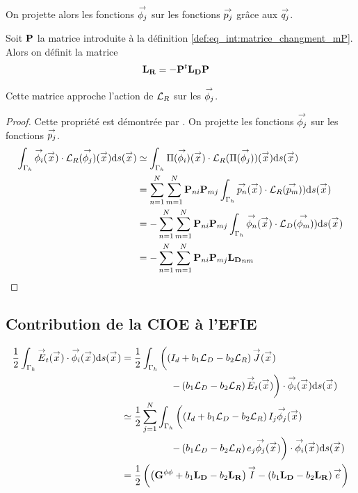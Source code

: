     On projette alors les fonctions \(\phij\) sur les fonctions \(\pj\) grâce aux \(\qj\).
    \begin{defn}
      Soit \(\mPP\) la matrice introduite à la définition \ref{def:eq_int:matrice_changment_mP}. Alors on définit la matrice
      \begin{align*}
        \mLR & = -\mPP^t\mLD\mPP
      \end{align*}
    \end{defn}
    \begin{prop}
      Cette matrice approche l'action de \(\LR\) sur les \(\phij\).
    \end{prop}
    \begin{proof}
      Cette propriété est démontrée par \cite[eq.~(17)]{stupfel_implementation_2015}. On projette les fonctions \(\phij\) sur les fonctions \(\pj\).
      \begin{align*}
        \int_{\Gamma_h} \phii(\vx) \cdot \LR(\phij)(\vx) \dd{s}(\vx) &\simeq \int_{\Gamma_h} \Pi(\phii)(\vx) \cdot \LR(\Pi(\phij)) (\vx) \dd{s}(\vx)
        \\
        &=\sum_{n=1}^{N} \sum_{m=1}^{N} \mPP_{ni} \mPP_{mj} \int_{\Gamma_h}\pn(\vx)\cdot\LR(\ppm)) \dd{s}(\vx)
        \\
        &=-\sum_{n=1}^{N} \sum_{m=1}^{N} \mPP_{ni} \mPP_{mj} \int_{\Gamma_h}\phin(\vx)\cdot\LD(\phim)) \dd{s}(\vx)
        \\
        &=-\sum_{n=1}^{N} \sum_{m=1}^{N} \mPP_{ni} \mPP_{mj} \mLD_{nm}
      \end{align*}
    \end{proof}

  \subsection{Contribution de la CIOE à l'EFIE}

    \begin{equation*}
      \begin{aligned}
        \frac{1}{2} \int_{\Gamma_h} \vE_t(\vx) \cdot \phii(\vx) \dd{s}(\vx)
        &= \frac{1}{2} \int_{\Gamma_h}  \left( \left(I_d + b_1 \LD - b_2 \LR\right) \vJ (\vx)\right.
        \\
        & \hspace{5em} \left.  - \left( b_1 \LD - b_2 \LR\right) \vE_t (\vx) \right) \cdot \phii(\vx) \dd{s}(\vx)
        \\
        & \simeq \frac{1}{2} \sum_{j=1}^N \int_{\Gamma_h} \left( \left(I_d + b_1 \LD - b_2 \LR\right) I_j \phij (\vx)\right.
        \\
        & \hspace{5em} \left.  - \left( b_1 \LD - b_2 \LR\right) e_j \phij (\vx) \right) \cdot \phii(\vx) \dd{s}(\vx)
        \\
        & = \frac{1}{2} \left( \left(\mG{\phi}{\phi} + b_1 \mLD - b_2 \mLR\right) \vect{I}  - \left( b_1 \mLD - b_2 \mLR\right) \vect{e}\right)
      \end{aligned}
    \end{equation*}

